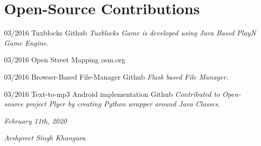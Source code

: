 \documentclass[]{friggeri-cv}
\begin{document}
\section{Open-Source Contributions}
\begin{entrylist}
 \entry
    {03/2016}
    {Tuxblocks}
    {Github}
    {\emph{Tuxblocks Game is developed using Java Based PlayN Game Engine.}}

 \entry
    {03/2016}
    {Open Street Mapping}
    {osm.org}
    {\emph{}}

 \entry
    {03/2016}
    {Browser-Based File-Manager}
    {Github}
    {\emph{Flask based File Manager.}}

 \entry
    {03/2016}
    {Text-to-mp3 Android implementation}
    {Github}
    {\emph{Contributed to Open-source project Plyer by creating Python wrapper around Java Classes.}}


\end{entrylist}
\begin{flushleft}
\emph{February 11th, 2020}
\end{flushleft}
\begin{flushright}
\emph{Arshpreet Singh Khangura}
\end{flushright}
\end{document}

